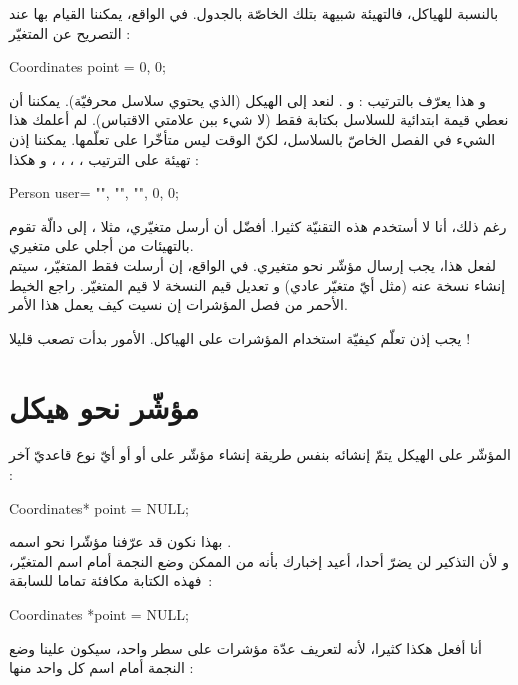 بالنسبة للهياكل، فالتهيئة شبيهة بتلك الخاصّة بالجدول. في الواقع، يمكننا القيام بها عند التصريح عن المتغيّر :

\begin{Csource}
Coordinates point = {0, 0};
\end{Csource}

و هذا يعرّف بالترتيب :
و
.
لنعد إلى الهيكل
(الذي يحتوي سلاسل محرفيّة). يمكننا أن نعطي قيمة ابتدائية للسلاسل بكتابة فقط
(لا شيء ببن علامتي الاقتباس). لم أعلمك هذا الشيء في الفصل الخاصّ بالسلاسل، لكنّ الوقت ليس متأخّرا على تعلّمها.
يمكننا إذن تهيئة على الترتيب
،
،
،
،
و
هكذا :

\begin{Csource}
Person user= {"", "", "", 0, 0};
\end{Csource}

رغم ذلك، أنا لا أستخدم هذه التقنيّة كثيرا. أفضّل أن أرسل متغيّري، مثلا
،
إلى دالّة
تقوم بالتهيئات من أجلي على متغيري.\\
لفعل هذا، يجب إرسال مؤشّر نحو متغيري. في الواقع، إن أرسلت فقط المتغيّر، سيتم إنشاء نسخة عنه (مثل أيّ متغيّر عادي) و تعديل قيم النسخة لا قيم المتغيّر. راجع الخيط الأحمر من فصل المؤشرات إن نسيت كيف يعمل هذا الأمر.

يجب إذن تعلّم كيفيّة استخدام المؤشرات على الهياكل. الأمور بدأت تصعب قليلا !

\section{مؤشّر نحو هيكل}

المؤشّر على الهيكل يتمّ إنشائه بنفس طريقة إنشاء مؤشّر على
أو
أو أيّ نوع قاعديّ آخر :

\begin{Csource}
Coordinates* point = NULL;
\end{Csource}
بهذا نكون قد عرّفنا مؤشّرا نحو
اسمه
.\\
و لأن التذكير لن يضرّ أحدا، أعيد إخبارك بأنه من الممكن وضع النجمة أمام اسم المتغيّر، فهذه الكتابة مكافئة تماما للسابقة~:

\begin{Csource}
Coordinates *point = NULL;
\end{Csource}

أنا أفعل هكذا كثيرا، لأنه لتعريف عدّة مؤشرات على سطر واحد، سيكون علينا وضع النجمة أمام اسم كل واحد منها :

